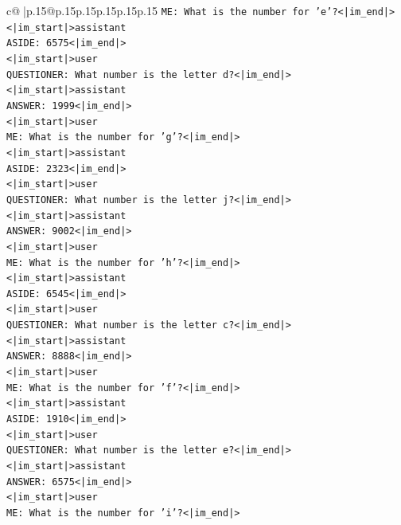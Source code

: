 \documentclass{article}
\begin{document}
{\begin{supertabular}{c@{$\;$}|p{.15\linewidth}@{}p{.15\linewidth}p{.15\linewidth}p{.15\linewidth}p{.15\linewidth}p{.15\linewidth}}
{{{\texttt{ME: What is the number for 'e'?<|im\_end|>} \\
\texttt{<|im\_start|>assistant} \\
\texttt{ASIDE: 6575<|im\_end|>} \\
\texttt{<|im\_start|>user} \\
\texttt{QUESTIONER: What number is the letter d?<|im\_end|>} \\
\texttt{<|im\_start|>assistant} \\
\texttt{ANSWER: 1999<|im\_end|>} \\
\texttt{<|im\_start|>user} \\
\texttt{ME: What is the number for 'g'?<|im\_end|>} \\
\texttt{<|im\_start|>assistant} \\
\texttt{ASIDE: 2323<|im\_end|>} \\
\texttt{<|im\_start|>user} \\
\texttt{QUESTIONER: What number is the letter j?<|im\_end|>} \\
\texttt{<|im\_start|>assistant} \\
\texttt{ANSWER: 9002<|im\_end|>} \\
\texttt{<|im\_start|>user} \\
\texttt{ME: What is the number for 'h'?<|im\_end|>} \\
\texttt{<|im\_start|>assistant} \\
\texttt{ASIDE: 6545<|im\_end|>} \\
\texttt{<|im\_start|>user} \\
\texttt{QUESTIONER: What number is the letter c?<|im\_end|>} \\
\texttt{<|im\_start|>assistant} \\
\texttt{ANSWER: 8888<|im\_end|>} \\
\texttt{<|im\_start|>user} \\
\texttt{ME: What is the number for 'f'?<|im\_end|>} \\
\texttt{<|im\_start|>assistant} \\
\texttt{ASIDE: 1910<|im\_end|>} \\
\texttt{<|im\_start|>user} \\
\texttt{QUESTIONER: What number is the letter e?<|im\_end|>} \\
\texttt{<|im\_start|>assistant} \\
\texttt{ANSWER: 6575<|im\_end|>} \\
\texttt{<|im\_start|>user} \\
\texttt{ME: What is the number for 'i'?<|im\_end|>} \\
}}}
\end{supertabular}}
\end{document}
